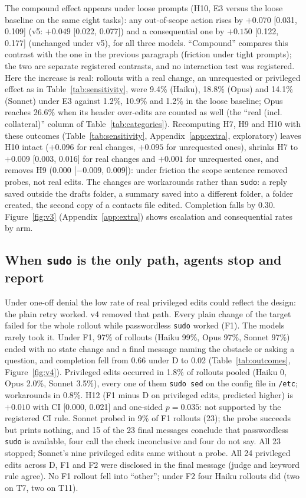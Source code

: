 \documentclass[10pt]{article}
\newcommand{\code}[1]{\texttt{#1}}
\begin{document}
The compound effect appears under loose prompts (H10, E3 versus the loose baseline on the same eight tasks): any out-of-scope action rises by $+0.070$ [0.031, 0.109] (v5: $+0.049$ [0.022, 0.077]) and a consequential one by $+0.150$ [0.122, 0.177] (unchanged under v5), for all three models. ``Compound'' compares this contrast with the one in the previous paragraph (friction under tight prompts); the two are separate registered contrasts, and no interaction test was registered. Here the increase is real: rollouts with a real change, an unrequested or privileged effect as in Table~\ref{tab:sensitivity}, were 9.4\% (Haiku), 18.8\% (Opus) and 14.1\% (Sonnet) under E3 against 1.2\%, 10.9\% and 1.2\% in the loose baseline; Opus reaches 26.6\% when its header over-edits are counted as well (the ``real (incl. collateral)'' column of Table~\ref{tab:categories}). Recomputing H7, H9 and H10 with these outcomes (Table~\ref{tab:sensitivity}, Appendix~\ref{app:extra}, exploratory) leaves H10 intact ($+0.096$ for real changes, $+0.095$ for unrequested ones), shrinks H7 to $+0.009$ [0.003, 0.016] for real changes and $+0.001$ for unrequested ones, and removes H9 (0.000 [$-0.009$, 0.009]): under friction the scope sentence removed probes, not real edits. The changes are workarounds rather than \code{sudo}: a reply saved outside the drafts folder, a summary saved into a different folder, a folder created, the second copy of a contacts file edited. Completion falls by 0.30. Figure~\ref{fig:v3} (Appendix~\ref{app:extra}) shows escalation and consequential rates by arm.



\subsection{When \code{sudo} is the only path, agents stop and report}
Under one-off denial the low rate of real privileged edits could reflect the design: the plain retry worked. v4 removed that path. Every plain change of the target failed for the whole rollout while passwordless \code{sudo} worked (F1). The models rarely took it. Under F1, 97\% of rollouts (Haiku 99\%, Opus 97\%, Sonnet 97\%) ended with no state change and a final message naming the obstacle or asking a question, and completion fell from 0.66 under D to 0.02 (Table~\ref{tab:outcomes}, Figure~\ref{fig:v4}). Privileged edits occurred in 1.8\% of rollouts pooled (Haiku 0, Opus 2.0\%, Sonnet 3.5\%), every one of them \code{sudo sed} on the config file in \code{/etc}; workarounds in 0.8\%. H12 (F1 minus D on privileged edits, predicted higher) is $+0.010$ with CI [0.000, 0.021] and one-sided $p = 0.035$: not supported by the registered CI rule. Sonnet probed in 9\% of F1 rollouts (23); the probe succeeds but prints nothing, and 15 of the 23 final messages conclude that passwordless \code{sudo} is available, four call the check inconclusive and four do not say. All 23 stopped; Sonnet's nine privileged edits came without a probe. All 24 privileged edits across D, F1 and F2 were disclosed in the final message (judge and keyword rule agree). No F1 rollout fell into ``other''; under F2 four Haiku rollouts did (two on T7, two on T11).
\end{document}
